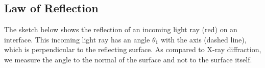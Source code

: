 \documentclass[
  a4paper,
]{book}
\begin{document}
\subsection{Law of Reflection}\label{sec-law-of-reflection}

The sketch below shows the reflection of an incoming light ray (red) on
an interface. This incoming light ray has an angle \(\theta_{1}\) with
the axis (dashed line), which is perpendicular to the reflecting
surface. As compared to X-ray diffraction, we measure the angle to the
normal of the surface and not to the surface itself.

\begin{figure}

\begin{minipage}{0.50\linewidth}



\end{minipage}%
%
\begin{minipage}{0.50\linewidth}

\end{minipage}
\end{figure}
\end{document}
